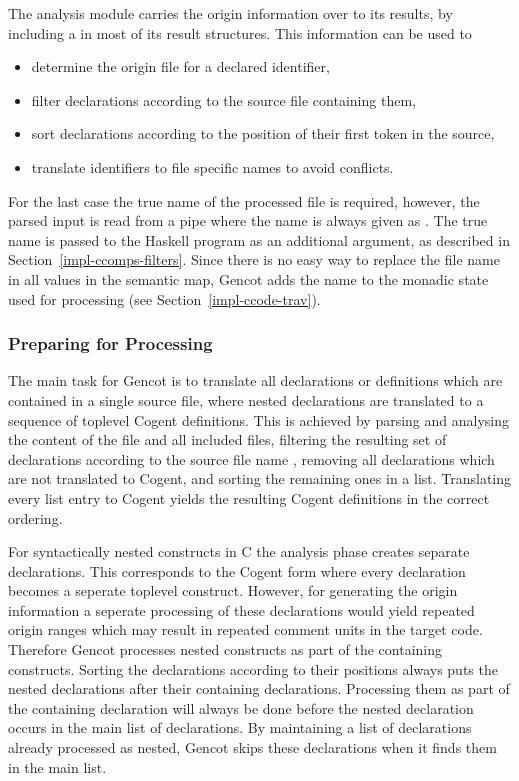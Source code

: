 The analysis module carries the origin information over to its results, by including a  in most of its
result structures. This information can be used to
\begin{itemize}
\item determine the origin file for a declared identifier,
\item filter declarations according to the source file containing them,
\item sort declarations according to the position of their first token in the source,
\item translate identifiers to file specific names to avoid conflicts.
\end{itemize}

For the last case the true name of the processed file is required, however, the parsed input is read from a pipe where
the name is always given as . The true name is passed to the Haskell program as an additional 
argument, as described in Section~\ref{impl-ccomps-filters}. Since there is no easy way to replace the file name in
all  values in the semantic map, Gencot adds the name to the monadic state used for processing
(see Section~\ref{impl-ccode-trav}).

\subsubsection{Preparing for Processing}

The main task for Gencot is to translate all declarations or definitions which are contained in a single source file, where
nested declarations are translated to a sequence of toplevel Cogent definitions. This is achieved by parsing and analysing
the content of the file and all included files, filtering the resulting set of declarations according to the source file name
, removing all declarations which are not translated to Cogent, and sorting the remaining ones in a list. 
Translating every list entry to Cogent yields the resulting Cogent definitions in the correct ordering.

For syntactically nested constructs in C the analysis phase creates separate declarations. This corresponds to the 
Cogent form where every declaration becomes a seperate toplevel construct. However, for generating the origin information 
a seperate processing of these declarations would yield repeated origin ranges which may result in repeated comment units in
the target code. Therefore Gencot processes nested 
constructs as part of the containing constructs. Sorting the declarations according to their positions always puts the
nested declarations after their containing declarations. Processing them as part of the containing declaration will
always be done before the nested declaration occurs in the main list of declarations. By maintaining a list of declarations
already processed as nested, Gencot skips these declarations when it finds them in the main list.

